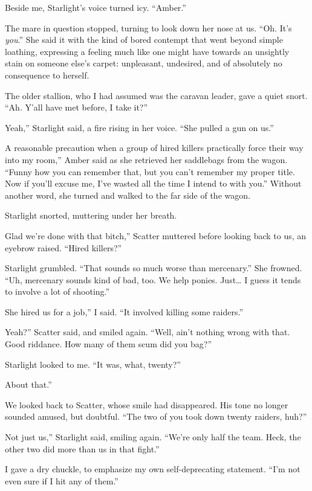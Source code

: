 Beside me, Starlight’s voice turned icy. “Amber.”

The mare in question stopped, turning to look down her nose at us. “Oh. It’s \textit{you}.” She said it with the kind of bored contempt that went beyond simple loathing, expressing a feeling much like one might have towards an unsightly stain on someone else’s carpet: unpleasant, undesired, and of absolutely no consequence to herself.

The older stallion, who I had assumed was the caravan leader, gave a quiet snort. “Ah. Y’all have met before, I take it?”

\leavevmode{}Yeah,” Starlight said, a fire rising in her voice. “She pulled a gun on us.”

\leavevmode{}A reasonable precaution when a group of hired killers practically force their way into my room,” Amber said as she retrieved her saddlebags from the wagon. “Funny how you can remember that, but you can’t remember my proper title. Now if you’ll excuse me, I’ve wasted all the time I intend to with you.” Without another word, she turned and walked to the far side of the wagon.

Starlight snorted, muttering under her breath.

\leavevmode{}Glad we’re done with that bitch,” Scatter muttered before looking back to us, an eyebrow raised. “Hired killers?”

Starlight grumbled. “That sounds so much worse than mercenary.” She frowned. “Uh, mercenary sounds kind of bad, too. We help ponies. Just… I guess it tends to involve a lot of shooting.”

\leavevmode{}She hired us for a job,” I said. “It involved killing some raiders.”

\leavevmode{}Yeah?” Scatter said, and smiled again. “Well, ain’t nothing wrong with that. Good riddance. How many of them scum did you bag?”

Starlight looked to me. “It was, what, twenty?”

\leavevmode{}About that.”

We looked back to Scatter, whose smile had disappeared. His tone no longer sounded amused, but doubtful. “The two of you took down twenty raiders, huh?”

\leavevmode{}Not just us,” Starlight said, smiling again. “We’re only half the team. Heck, the other two did more than us in that fight.”

I gave a dry chuckle, to emphasize my own self-deprecating statement. “I’m not even sure if I hit any of them.”

